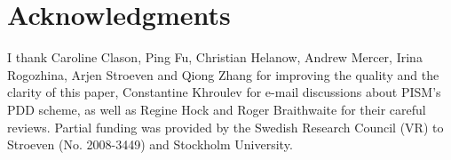 \documentclass[review]{igs}
\begin{document}

\section{Acknowledgments}

I thank Caroline Clason, Ping Fu, Christian Helanow, Andrew Mercer, Irina Rogozhina, Arjen Stroeven and Qiong Zhang for improving the quality and the clarity of this paper, Constantine Khroulev for e-mail discussions about PISM's PDD scheme, as well as Regine Hock and Roger Braithwaite for their careful reviews. Partial funding was provided by the Swedish Research Council (VR) to Stroeven (No. 2008-3449) and Stockholm University.



\end{document}
